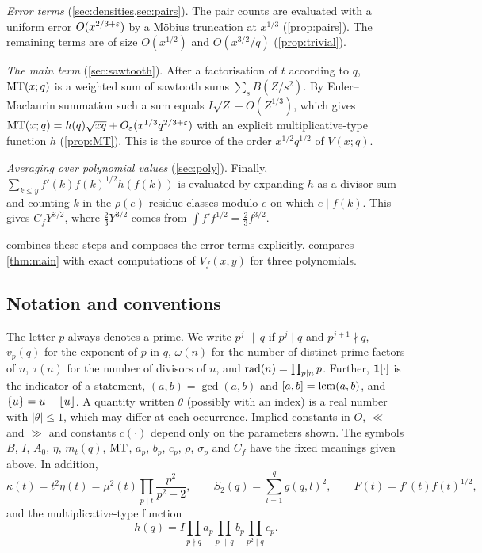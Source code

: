 \emph{Error terms} (\cref{sec:densities,sec:pairs}). The pair counts are evaluated with a uniform error $O(x^{2/3+\varepsilon})$ by a Möbius truncation at $x^{1/3}$ (\cref{prop:pairs}). The remaining terms are of size $O(x^{1/2})$ and $O(x^{3/2}/q)$ (\cref{prop:trivial}).

\emph{The main term} (\cref{sec:sawtooth}). After a factorisation of $t$ according to $q$, $\mathrm{MT}(x;q)$ is a weighted sum of sawtooth sums $\sum_sB(Z/s^2)$. By Euler--Maclaurin summation such a sum equals $I\sqrt Z+O(Z^{1/3})$, which gives $\mathrm{MT}(x;q)=h(q)\sqrt{xq}+O_\varepsilon(x^{1/3}q^{2/3+\varepsilon})$ with an explicit multiplicative-type function $h$ (\cref{prop:MT}). This is the source of the order $x^{1/2}q^{1/2}$ of $V(x;q)$.

\emph{Averaging over polynomial values} (\cref{sec:poly}). Finally, $\sum_{k\le y}f'(k)f(k)^{1/2}h(f(k))$ is evaluated by expanding $h$ as a divisor sum and counting $k$ in the $\rho(e)$ residue classes modulo $e$ on which $e\mid f(k)$. This gives $C_fY^{3/2}$, where $\tfrac23Y^{3/2}$ comes from $\int f'f^{1/2}=\tfrac23f^{3/2}$.

 combines these steps and composes the error terms explicitly.  compares \cref{thm:main} with exact computations of $V_f(x,y)$ for three polynomials.

\subsection{Notation and conventions}\label{sec:notation}

The letter $p$ always denotes a prime. We write $p^j\,\|\,q$ if $p^j\mid q$ and $p^{j+1}\nmid q$, $v_p(q)$ for the exponent of $p$ in $q$, $\omega(n)$ for the number of distinct prime factors of $n$, $\tau(n)$ for the number of divisors of $n$, and $\operatorname{rad}(n)=\prod_{p\mid n}p$. Further, $\mathbf{1}[\cdot]$ is the indicator of a statement, $(a,b)=\gcd(a,b)$ and $[a,b]=\operatorname{lcm}(a,b)$, and $\{u\}=u-\lfloor u\rfloor$. A quantity written $\theta$ (possibly with an index) is a real number with $|\theta|\le1$, which may differ at each occurrence. Implied constants in $O$, $\ll$ and $\gg$ and constants $c(\cdot)$ depend only on the parameters shown. The symbols $B$, $I$, $A_0$, $\eta$, $m_t(q)$, $\mathrm{MT}$, $a_p$, $b_p$, $c_p$, $\rho$, $\sigma_p$ and $C_f$ have the fixed meanings given above. In addition,
\begin{equation}\label{eq:kappa-S2}
\kappa(t)=t^2\eta(t)=\mu^2(t)\prod_{p\mid t}\frac{p^2}{p^2-2},\qquad S_2(q)=\sum_{l=1}^qg(q,l)^2,\qquad F(t)=f'(t)f(t)^{1/2},
\end{equation}
and the multiplicative-type function
\begin{equation}\label{eq:h}
h(q)=I\prod_{p\nmid q}a_p\prod_{p\,\|\,q}b_p\prod_{p^2\mid q}c_p .
\end{equation}
